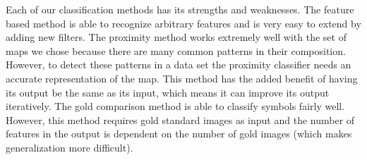 
Each of our classification methods has its strengths and weaknesses.  The
feature based method is able to recognize arbitrary features and is very easy
to extend by adding new filters.  The proximity method works extremely well
with the set of maps we chose because there are many common patterns in their
composition.  However, to detect these patterns in a data set the proximity
classifier needs an accurate representation of the map. This method has the
added benefit of having its output be the same as its input, which means it can
improve its output iteratively.  The gold comparison method is able to classify
symbols fairly well. However, this method requires gold standard images as input and the
number of features in the output is dependent on the number of gold images
(which makes generalization more difficult).

